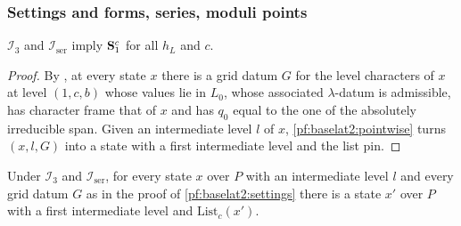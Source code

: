 \subsubsection{Settings and forms, series, moduli points}

\begin{proposition}\label{pf:baselat2:settings}
$\mathcal{I}_3$ and $\mathcal{I}_{\mathrm{ser}}$ imply $\mathbf{S}_{\mathrm{1}}^{c}$ for all $h_L$ and $c$.
\end{proposition}

\begin{proof}
By , at every state $x$ there is a grid datum
$G$ for the level characters of $x$ at level $(1,c,b)$ whose values lie in $L_0$, whose associated
$\lambda$-datum is admissible, has character frame that of $x$ and has $q_0$ equal to the one of the
absolutely irreducible span. Given an intermediate level $l$ of $x$, \cref{pf:baselat2:pointwise} turns
$(x,l,G)$ into a state with a first intermediate level and the list pin.
\end{proof}

\begin{lemma}\label{pf:baselat2:pointwise}
Under $\mathcal{I}_3$ and $\mathcal{I}_{\mathrm{ser}}$, for every state $x$ over $P$ with an
intermediate level $l$ and every grid datum $G$ as in the proof of \cref{pf:baselat2:settings} there is a
state $x'$ over $P$ with a first intermediate level and $\mathrm{List}_c(x')$.
\end{lemma}

